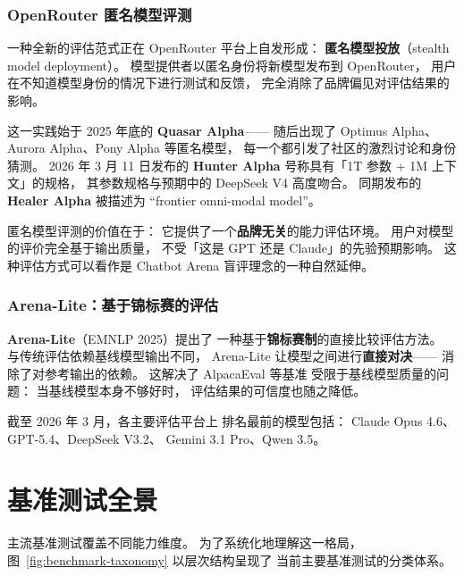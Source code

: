 \subsubsection{OpenRouter 匿名模型评测}

一种全新的评估范式正在 OpenRouter 平台上自发形成：
\textbf{匿名模型投放}（stealth model deployment）。
模型提供者以匿名身份将新模型发布到 OpenRouter，
用户在不知道模型身份的情况下进行测试和反馈，
完全消除了品牌偏见对评估结果的影响。

这一实践始于 2025 年底的 \textbf{Quasar Alpha}——
随后出现了 Optimus Alpha、Aurora Alpha、Pony Alpha 等匿名模型，
每一个都引发了社区的激烈讨论和身份猜测。
2026 年 3 月 11 日发布的 \textbf{Hunter Alpha}
号称具有「1T 参数 + 1M 上下文」的规格，
其参数规格与预期中的 DeepSeek V4 高度吻合。
同期发布的 \textbf{Healer Alpha} 被描述为
“frontier omni-modal model”。

匿名模型评测的价值在于：
它提供了一个\textbf{品牌无关}的能力评估环境。
用户对模型的评价完全基于输出质量，
不受「这是 GPT 还是 Claude」的先验预期影响。
这种评估方式可以看作是
Chatbot Arena 盲评理念的一种自然延伸。

\subsubsection{Arena-Lite：基于锦标赛的评估}

\textbf{Arena-Lite}（EMNLP 2025）提出了
一种基于\textbf{锦标赛制}的直接比较评估方法。
与传统评估依赖基线模型输出不同，
Arena-Lite 让模型之间进行\textbf{直接对决}——
消除了对参考输出的依赖。
这解决了 AlpacaEval 等基准
受限于基线模型质量的问题：
当基线模型本身不够好时，
评估结果的可信度也随之降低。

截至 2026 年 3 月，各主要评估平台上
排名最前的模型包括：
Claude Opus 4.6、GPT-5.4、DeepSeek V3.2、
Gemini 3.1 Pro、Qwen 3.5。

\section{基准测试全景}

主流基准测试覆盖不同能力维度。
为了系统化地理解这一格局，
图~\ref{fig:benchmark-taxonomy} 以层次结构呈现了
当前主要基准测试的分类体系。


